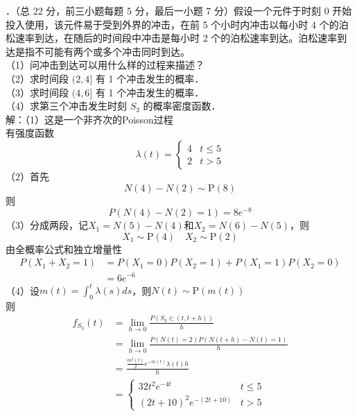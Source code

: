 \documentclass[UTF8]{ctexart}
\begin{document}
．（总 22 分，前三小题每题 5 分，最后一小题 7 分）假设一个元件于时刻 0 开始投入使用，该元件易于受到外界的冲击，在前 5 个小时内冲击以每小时 4 个的泊松速率到达，在随后的时间段中冲击是每小时 2 个的泊松速率到达。泊松速率到达是指不可能有两个或多个冲击同时到达。\\
（1）问冲击到达可以用什么样的过程来描述？\\
（2）求时间段 $(2,4]$ 有 1 个冲击发生的概率．\\
（3）求时间段 $(4,6]$ 有 1 个冲击发生的概率．\\
（4）求第三个冲击发生时刻 $S_{3}$ 的概率密度函数．\\
解：（1）这是一个非齐次的Poisson过程\\
有强度函数
\[
\lambda(t)=
\begin{cases}
	4  &  t\le 5 \\
	2  &  t>5
\end{cases}
\]
（2）首先$$N(4)-N(2)\sim \mathrm{P}(8)$$
则
\[
P(N(4)-N(2)=1)=8e^{-8}
\]
（3）分成两段，记$X_1=N(5)-N(4)$和$X_2=N(6)-N(5)$，则
\[
X_1\sim \mathrm{P}(4) \quad X_2 \sim \mathrm{P}(2)
\]
由全概率公式和独立增量性
\begin{align*}
	P(X_1+X_2=1) &= P(X_1=0)P(X_2=1)+P(X_1=1)P(X_2=0) \\
	 & =6e^{-6}
\end{align*}
（4）设$m(t)=\int_{0}^{t} \lambda(s)ds$，则$N(t)\sim \mathrm{P}(m(t))$\\
则
\begin{align*}
	f_{S_3}(t) & =\lim_{h\rightarrow 0}\frac{P\left( S_3\in (t,t+h)\right) }{h} \\
	&= \lim_{h\rightarrow 0}\frac{P(N(t)=2)P(N(t+h)-N(t)=1) }{h}\\
	&= \frac{\frac{m^2(t)}{2}e^{-m(t)}\lambda(t)h}{h} \\
	&=
	\begin{cases}
		32t^2 e^{-4t}  &  t \le 5 \\
		(2t+10)^2 e^{-(2t+10)} &  t>5
	\end{cases}
\end{align*}
\end{document}
